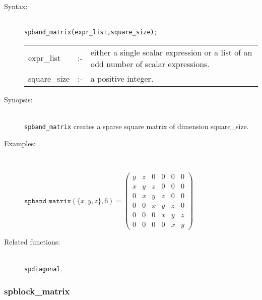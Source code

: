 \begin{description}
\item[Syntax:]\mbox{}\\
\texttt{spband\_matrix(expr\_list,square\_size);}\\[2mm]
\begin{tabular}{l l p{.72\linewidth}}
expr\_list  &:-& 
either a single scalar expression or a list of an odd number of scalar
expressions.\\
square\_size &:-& a positive integer.
\end{tabular}

\item[Synopsis:]\mbox{}\\
                \texttt{spband\_matrix} creates a sparse square matrix of 
                dimension square\_size. 

\item[Examples:]\mbox{}\\
\begin{flushleft}  
\begin{math}  
\texttt{spband\_matrix}(\{x,y,z\},6) = 
\begin{pmatrix} y & z & 0 & 0 & 0 & 0 \\ x & y & z & 0 & 0
& 0 \\ 0 & x & y & z & 0 & 0 \\ 0 & 0 & x & y & z & 0 \\ 0 & 0 & 0 & x &
 y & z \\ 0 & 0 & 0 & 0 & x & y 
\end{pmatrix} 
\end{math}  
\end{flushleft}

\item[Related functions:]\mbox{}\\
 \texttt{spdiagonal}.
\end{description}

\subsubsection{spblock\_matrix}
\label{sparse:spblock_matrix}

